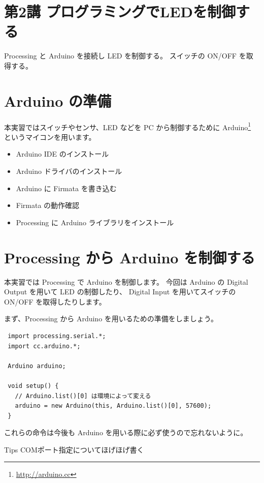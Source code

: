 \documentclass[11pt,a4paper]{jarticle}
\begin{document}
\section*{\LARGE{第2講 プログラミングでLEDを制御する}}
Processing と Arduino を接続し LED を制御する。
スイッチの ON/OFF を取得する。



\section{Arduino の準備}
本実習ではスイッチやセンサ、LED などを PC から制御するために Arduino\footnote{\url{http://arduino.cc}} というマイコンを用います。

\begin{itemize}
 \item Arduino IDE のインストール
 \item Arduino ドライバのインストール
 \item Arduino に Firmata を書き込む
 \item Firmata の動作確認
 \item Processing に Arduino ライブラリをインストール       
\end{itemize}


\section{Processing から Arduino を制御する}
本実習では Processing で Arduino を制御します。
今回は Arduino の Digital Output を用いて LED の制御したり、
Digital Input を用いてスイッチの ON/OFF を取得したりします。

まず、Processing から Arduino を用いるための準備をしましょう。
\begin{lstlisting}
 import processing.serial.*;
 import cc.arduino.*;

 Arduino arduino;

 void setup() {
   // Arduino.list()[0] は環境によって変える
   arduino = new Arduino(this, Arduino.list()[0], 57600);
 }
\end{lstlisting}
これらの命令は今後も Arduino を用いる際に必ず使うので忘れないように。

\begin{itembox}{Tips}
 COMポート指定についてほげほげ書く
\end{itembox}
\end{document}
